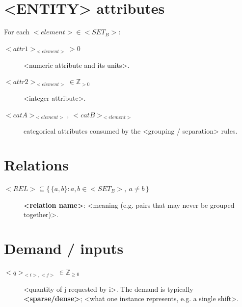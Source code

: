 \section{<ENTITY> attributes}
For each $<element> \in <SET_B>$:
\begin{description}
  \item[$<attr1>_{<element>} > 0$] <numeric attribute and its units>.
  \item[$<attr2>_{<element>} \in \mathbb{Z}_{>0}$] <integer attribute>.
  \item[$<catA>_{<element>},\ <catB>_{<element>}$] categorical attributes consumed by the <grouping / separation> rules.
\end{description}

\section{Relations}
\begin{description}
  \item[$<REL> \subseteq \{\,\{a,b\} : a,b \in <SET_B>,\ a \neq b\,\}$] \textbf{<relation name>}: <meaning (e.g. pairs that may never be grouped together)>.
\end{description}

\section{Demand / inputs}
\begin{description}
  \item[$<q>_{<i>,<j>} \in \mathbb{Z}_{\ge 0}$] <quantity of j requested by i>. The demand is typically \textbf{<sparse/dense>}; <what one instance represents, e.g. a single shift>.
\end{description}

